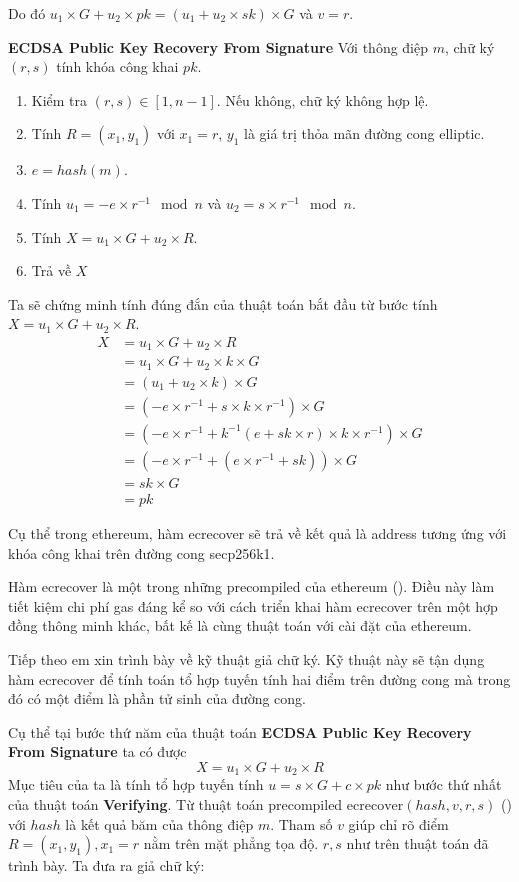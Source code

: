 \documentclass[../main.tex]{subfiles}
\begin{document}
Do đó $u_1 \times G + u_2 \times pk = (u_1 + u_2 \times sk)\times G$ và $v = r$.

\textbf{ECDSA Public Key Recovery From Signature}
Với thông điệp $m$, chữ ký $(r,s)$ tính khóa công khai $pk$.
\begin{enumerate}
    \item Kiểm tra $(r,s) \in [1,n-1]$. Nếu không, chữ ký không hợp lệ.
    \item Tính $R = (x_1,y_1)$ với $x_1 = r$, $y_1$ là giá trị thỏa mãn đường cong elliptic.
    \item $e = hash(m)$.
    \item Tính $u_1 = -e \times r^{-1}\mod n$ và $u_2 = s\times r^{-1}\mod{n}$.
    \item Tính $X = u_1 \times G + u_2 \times R$.
    \item Trả về $X$
\end{enumerate}
Ta sẽ chứng minh tính đúng đắn của thuật toán bắt đầu từ bước tính $X =u_1 \times G + u_2 \times R$.
\begin{align*}
    X   &= u_1 \times G + u_2 \times R \\
        &= u_1 \times G + u_2 \times k \times G\\
        &= (u_1 + u_2 \times k) \times G\\
        &= (-e\times r^{-1} + s\times k \times r^{-1}) \times G\\
        &= (-e\times r^{-1} +  k^{-1}(e + sk \times r) \times k \times r^{-1}) \times G\\
        &= (-e\times r^{-1} + (e\times r^{-1} + sk)) \times G\\
        &= sk \times G\\
        &= pk
\end{align*}

Cụ thể trong ethereum, hàm ecrecover sẽ trả về kết quả là address tương ứng với khóa công khai trên đường cong secp256k1.

Hàm ecrecover là một trong những precompiled của ethereum (\cite{wood2014ethereum}). Điều này làm tiết kiệm chi phí gas đáng kể so với cách triển khai hàm ecrecover trên một hợp đồng thông minh khác, bất kế là cùng thuật toán với cài đặt của ethereum. 

Tiếp theo em xin trình bày về kỹ thuật giả chữ ký. Kỹ thuật này sẽ tận dụng hàm ecrecover để tính toán tổ hợp tuyến tính hai điểm trên đường cong mà trong đó có một điểm là phần tử sinh của đường cong.

Cụ thể tại bước thứ năm của thuật toán \textbf{ECDSA Public Key Recovery From Signature} ta có được
\begin{equation*}
    X = u_1 \times G + u_2 \times R
\end{equation*}
Mục tiêu của ta là tính tổ hợp tuyến tính $u = s \times G + c \times pk $ như bước thứ nhất của thuật toán \textbf{Verifying}. Từ thuật toán precompiled $\text{ecrecover}(hash, v, r, s)$ (\cite{wood2014ethereum}) với $hash$ là kết quả băm của thông điệp $m$. Tham số $v$ giúp chỉ rõ điểm $R = (x_1,y_1), x_1 = r$ nằm trên mặt phẳng tọa độ. $r,s$ như trên thuật toán đã trình bày. Ta đưa ra giả chữ ký:
\end{document}
